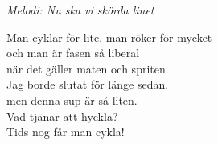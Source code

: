 {\footnotesize\textit{Melodi: Nu ska vi skörda linet}}\par
\vspace{10pt}
Man cyklar för lite, man röker för mycket\\
och man är fasen så liberal\\
när det gäller maten och spriten.\\
Jag borde slutat för länge sedan.\\
men denna sup är så liten.\\
Vad tjänar att hyckla?\\
Tids nog får man cykla!
